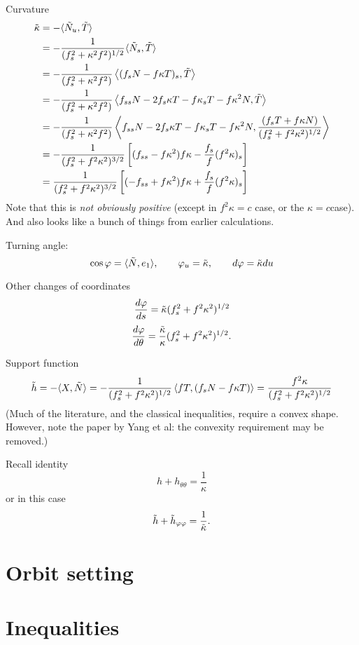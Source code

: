 \documentclass[12pt, a4paper]{amsart}
\theoremstyle{remark}
\begin{document}
Curvature
\begin{align*}
\tilde{\kappa}& =- \langle \tilde{N}_u,\tilde{T}\rangle \\
&=-\frac1{(f_s^2+\kappa^2 f^2)^{1/2}} \langle \tilde{N}_s,\tilde{T}\rangle \\
&=  -\frac1{(f_s^2+\kappa^2 f^2)}\left\langle 
(f_s N- f\kappa T)_s
,\tilde{T}\right\rangle \\
&=  -\frac1{(f_s^2+\kappa^2 f^2)}
\left\langle  f_{ss} N -2f_s\kappa T-f\kappa_s T-f\kappa^2 N
,\tilde{T}\right\rangle \\
&= -\frac1{(f_s^2+\kappa^2 f^2)} \left\langle 
f_{ss} N -2f_s\kappa T-f\kappa_s T-f\kappa^2 N
,  \frac{(f_s T+ f\kappa N)}{(f_s^2+f^2\kappa^2)^{1/2}} \right\rangle \\
&= - \frac1{(f_s^2+f^2\kappa^2)^{3/2}}\left[    (f_{ss}-f\kappa^2)f\kappa -\frac{f_s}{f}(f^2\kappa)_s\right]\\
&=  \frac1{(f_s^2+f^2\kappa^2)^{3/2}}\left[    (-f_{ss}+f\kappa^2)f\kappa +\frac{f_s}f(f^2\kappa)_s\right]
 \\
\end{align*}
Note that this is \emph{not obviously positive} (except in $f^2\kappa=c$ case, or the $\kappa=c $case).  And also looks like a bunch of things from earlier calculations.  

Turning angle:
$$\cos\varphi=\langle \tilde{N}, e_1 \rangle, \quad\quad   \varphi_u=\tilde{\kappa}, \quad\quad{d\varphi}=\tilde{\kappa} {du} $$

Other changes of coordinates
$$\frac{d\varphi}{ds}={\tilde{\kappa}}{{(f_s^2+f^2\kappa^2)^{1/2}}}$$
$$\frac{d\varphi}{d\theta}=\frac{\tilde{\kappa}}{\kappa}{{(f_s^2+f^2\kappa^2)^{1/2}}}.$$

Support function
$$\tilde{h}= -\langle X,\tilde{N} \rangle=- \frac1{(f_s^2+f^2\kappa^2)^{1/2}} \left\langle fT,  (f_s N- f\kappa T)   \right\rangle  = \frac{f^2\kappa}{(f_s^2+f^2\kappa^2)^{1/2}} $$
(Much of the literature, and the classical inequalities, require a convex shape.    However, note the paper by Yang et al:   the convexity requirement may be removed.) 

Recall identity 
$$ h+h_{\theta\theta}=\frac1\kappa$$
or in this case
$$ \tilde{h}+\tilde{h}_{\varphi\varphi}=\frac1{\tilde{\kappa}}.$$


\section*{Orbit setting}

\section*{Inequalities}
\end{document}
